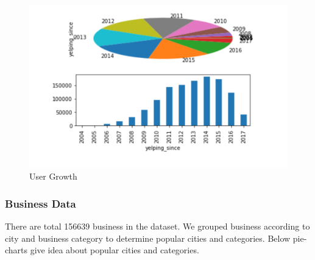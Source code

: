\documentclass[11pt]{article}
\begin{document}
	      \begin{figure}[H]
	     	\centering
	     	\includegraphics[scale=0.5] {user_growth.png}
	     	\caption{User Growth}
	     \end{figure}
     
     	\subsubsection{Business Data}
     	There are total 156639 business in the dataset. We grouped business according to city and business category to determine popular cities and categories. Below pie-charts give idea about popular cities and categories.
     	
\end{document}
